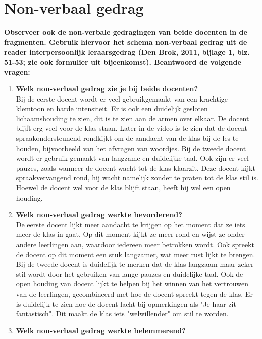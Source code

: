 \documentclass{article}
\begin{document}

    \section{Non-verbaal gedrag}
        \textbf{Observeer ook de non-verbale gedragingen van beide docenten in de fragmenten. Gebruik hiervoor het schema non-verbaal gedrag uit de reader interpersoonlijk leraarsgedrag (Den Brok, 2011, bijlage 1, blz. 51-53; zie ook formulier uit bijeenkomst). Beantwoord de volgende vragen:}
        \begin{enumerate}[label=(\alph*)]
            \item \textbf{Welk non-verbaal gedrag zie je bij beide docenten?}\\ 
            Bij de eerste docent wordt er veel gebruikgemaakt van een krachtige klemtoon en harde intensiteit. Er is ook een duidelijk gesloten lichaamshouding te zien, dit is te zien aan de armen over elkaar. De docent blijft erg veel voor de klas staan. Later in de video is te zien dat de docent spraakondersteunend rondkijkt om de aandacht van de klas bij de les te houden, bijvoorbeeld van het afvragen van woordjes.
            Bij de tweede docent wordt er gebruik gemaakt van langzame en duidelijke taal. Ook zijn er veel pauzes, zoals wanneer de docent wacht tot de klas klaarzit. Deze docent kijkt spraakvervangend rond, hij wacht namelijk zonder te praten tot de klas stil is. Hoewel de docent wel voor de klas blijft staan, heeft hij wel een open houding.
            \item \textbf{Welk non-verbaal gedrag werkte bevorderend?} \\
            De eerste docent lijkt meer aandacht te krijgen op het moment dat ze iets meer de klas in gaat. Op dit moment kijkt ze meer rond en wijst ze onder andere leerlingen aan, waardoor iedereen meer betrokken wordt. Ook spreekt de docent op dit moment een stuk langzamer, wat meer rust lijkt te brengen.
            Bij de tweede docent is duidelijk te merken dat de klas langzaam maar zeker stil wordt door het gebruiken van lange pauzes en duidelijke taal. Ook de open houding van docent lijkt te helpen bij het winnen van het vertrouwen van de leerlingen, gecombineerd met hoe de docent spreekt tegen de klas. Er is duidelijk te zien hoe de docent lacht bij opmerkingen als "Je haar zit fantastisch". Dit maakt de klas iets "welwillender" om stil te worden.
            \item \textbf{Welk non-verbaal gedrag werkte belemmerend?} \\

\end{enumerate}
\end{document}
